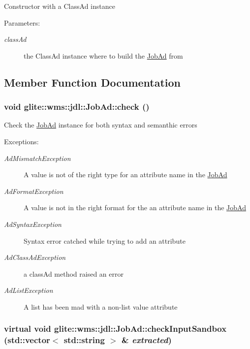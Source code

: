 Constructor with a Class\-Ad instance \begin{Desc}
\item[Parameters:]
\begin{description}
\item[{\em class\-Ad}]the Class\-Ad instance where to build the \hyperlink{classglite_1_1wms_1_1jdl_1_1JobAd}{Job\-Ad} from\end{description}
\end{Desc}


\subsection{Member Function Documentation}
\hypertarget{classglite_1_1wms_1_1jdl_1_1JobAd_z9_3}{
\subsubsection[check]{\setlength{\rightskip}{0pt plus 5cm}void glite::wms::jdl::Job\-Ad::check ()}}
\label{classglite_1_1wms_1_1jdl_1_1JobAd_z9_3}


Check the \hyperlink{classglite_1_1wms_1_1jdl_1_1JobAd}{Job\-Ad} instance for both syntax and semanthic errors \begin{Desc}
\item[Exceptions:]
\begin{description}
\item[{\em Ad\-Mismatch\-Exception}]A value is not of the right type for an attribute name in the \hyperlink{classglite_1_1wms_1_1jdl_1_1JobAd}{Job\-Ad} \item[{\em Ad\-Format\-Exception}]A value is not in the right format for the an attribute name in the \hyperlink{classglite_1_1wms_1_1jdl_1_1JobAd}{Job\-Ad} \item[{\em Ad\-Syntax\-Exception}]Syntax error catched while trying to add an attribute \item[{\em Ad\-Class\-Ad\-Exception}]a class\-Ad method raised an error \item[{\em Ad\-List\-Exception}]A list has been mad with a non-list value attribute\end{description}
\end{Desc}
\hypertarget{classglite_1_1wms_1_1jdl_1_1JobAd_b0}{
\subsubsection[checkInputSandbox]{\setlength{\rightskip}{0pt plus 5cm}virtual void glite::wms::jdl::Job\-Ad::check\-Input\-Sandbox (std::vector$<$ std::string $>$ \& {\em extracted})}}
\label{classglite_1_1wms_1_1jdl_1_1JobAd_b0}




